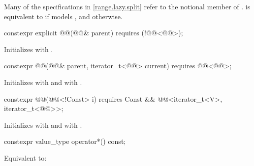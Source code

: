 \pnum
Many of the specifications in \ref{range.lazy.split} refer to the notional member
 of .
 is equivalent to  if 
models , and  otherwise.

%
\begin{itemdecl}
constexpr explicit @@(@@& parent)
  requires (!@@<@@>);
\end{itemdecl}

\begin{itemdescr}
\pnum
\effects
Initializes  with .
\end{itemdescr}

%
\begin{itemdecl}
constexpr @@(@@& parent, iterator_t<@@> current)
  requires @@<@@>;
\end{itemdecl}

\begin{itemdescr}
\pnum
\effects
Initializes  with 
and  with .
\end{itemdescr}

%
\begin{itemdecl}
constexpr @@(@@<!Const> i)
  requires Const && @@<iterator_t<V>, iterator_t<@@>>;
\end{itemdecl}

\begin{itemdescr}
\pnum
\effects
Initializes  with  and
 with .
\end{itemdescr}

%
\begin{itemdecl}
constexpr value_type operator*() const;
\end{itemdecl}

\begin{itemdescr}
\pnum
\effects
Equivalent to: 
\end{itemdescr}

